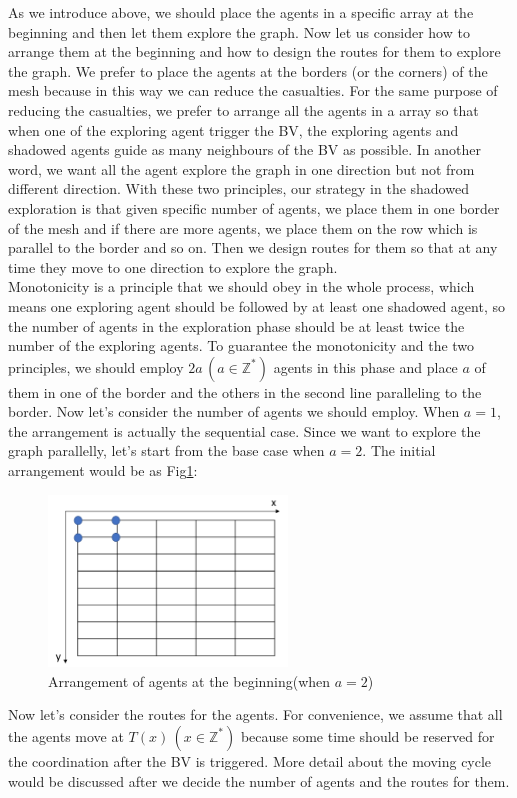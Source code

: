 As we introduce above, we should place the agents in a specific array at the beginning and then let them explore the graph. Now let us consider how to arrange them at the beginning and how to design the routes for them to explore the graph. We prefer to place the agents at the borders (or the corners) of the mesh because in this way we can reduce the casualties. For the same purpose of reducing the casualties, we prefer to arrange all the agents in a array so that when one of the exploring agent trigger the BV, the exploring agents and shadowed agents guide as many neighbours of the BV as possible. In another word, we want all the agent explore the graph in one direction but not from different direction. With these two principles, our strategy in the shadowed exploration is that given specific number of agents, we place them in one border of the mesh and if there are more agents, we place them on the row which is parallel to the border and so on. Then we design routes for them so that at any time they move to one direction to explore the graph. \\
Monotonicity is a principle that we should obey in the whole process, which means one exploring agent should be followed by at least one shadowed agent, so the number of agents in the exploration phase should be at least twice the number of the exploring agents. To guarantee the monotonicity and the two principles, we should employ $2a\,(a\in\mathbb{Z}^*)$ agents in this phase and place $a$ of them in one of the border and the others in the second line paralleling to the border.
Now let's consider the number of agents we should employ.
When $a=1$, the arrangement is actually the sequential case. Since we want to explore the graph parallelly, let's start from the base case when $a=2$. The initial arrangement would be as Fig\ref{fig:twoagent1}:
\begin{figure}[H]
  \centering  
  \includegraphics[width=2.5in]{figures/twoagent1.png}
  \caption{Arrangement of agents at the beginning(when $a=2$)}\label{fig:twoagent1}
\end{figure}
Now let's consider the routes for the agents. For convenience, we assume that all the agents move at $T(x)\,(x\in\mathbb{Z}^*)$ because some time should be reserved for the coordination after the BV is triggered. More detail about the moving cycle would be discussed after we decide the number of agents and the routes for them. 
